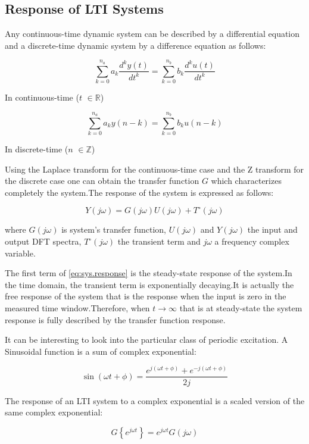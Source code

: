 \documentclass[a4paper,12pt]{article}
\numberwithin{equation}{section}
\begin{document}
\subsection{Response of LTI Systems}
Any  continuous-time dynamic system can be described by a differential equation and a discrete-time dynamic system by a difference equation as follows:



\[\sum_{k=0}^{n_{a}} a_{k} \frac{d^{k} y(t)}{d t^{k}}=\sum_{k=0}^{n_{b}} b_{k} \frac{d^{k} u(t)}{d t^{k}} \]

In continuous-time ($t$ $\in \mathbb{R}$)

\[\sum_{k=0}^{n_{a}} a_{k} y(n-k)=\sum_{k=0}^{n_{b}} b_{k} u(n-k)\]

In discrete-time  ($n$ $\in \mathbb{Z}$)


Using the Laplace transform for the continuous-time case and the Z transform for the discrete case one can obtain the transfer function $G$ which characterizes completely the system.The response of the system is expressed as follows:

\begin{equation}\label{eq:sys.response}
Y(j\omega)=G\left(j\omega\right) U(j \omega)+T^{\circ}(j\omega)
\end{equation}

where $G\left(j\omega\right)$ is system's transfer function, $U(j \omega)$ and $Y(j\omega)$ the input and output DFT spectra, $T^{\circ}(j\omega)$ the transient term and $j \omega$ a frequency complex variable.

The first term of \eqref{eq:sys.response} is the steady-state response of the system.In the time domain, the transient term is exponentially decaying.It is actually the free response of the system that is the response when the input is zero in the measured time window.Therefore, when $t\rightarrow \infty$ that is at steady-state the system response is fully described by the transfer function response.

It can be interesting to look into the particular class of periodic excitation. A Sinusoidal function is a sum of complex exponential:

\[\sin (\omega t+\phi)=\frac{e^{j(\omega t+\phi)}+e^{-j(\omega t+\phi)}}{2 j}\]

The response of an LTI system to a complex exponential  is a scaled version of the same complex
exponential:

\[G\left\{e^{j \omega t}\right\}=e^{j \omega t} G(j \omega)\]
\end{document}
